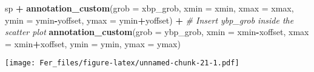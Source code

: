 \documentclass[
]{article}
\newenvironment{Shaded}{\begin{snugshade}}{\end{snugshade}}
\newcommand{\AttributeTok}[1]{\textcolor[rgb]{0.13,0.29,0.53}{#1}}
\newcommand{\CommentTok}[1]{\textcolor[rgb]{0.56,0.35,0.01}{\textit{#1}}}
\newcommand{\FunctionTok}[1]{\textcolor[rgb]{0.13,0.29,0.53}{\textbf{#1}}}
\newcommand{\NormalTok}[1]{#1}
\newcommand{\SpecialCharTok}[1]{\textcolor[rgb]{0.81,0.36,0.00}{\textbf{#1}}}
\begin{document}
\begin{Shaded}
\begin{Highlighting}[]
\NormalTok{sp }\SpecialCharTok{+} \FunctionTok{annotation\_custom}\NormalTok{(}\AttributeTok{grob =}\NormalTok{ xbp\_grob, }\AttributeTok{xmin =}\NormalTok{ xmin, }\AttributeTok{xmax =}\NormalTok{ xmax, }
                       \AttributeTok{ymin =}\NormalTok{ ymin}\SpecialCharTok{{-}}\NormalTok{yoffset, }\AttributeTok{ymax =}\NormalTok{ ymin}\SpecialCharTok{+}\NormalTok{yoffset) }\SpecialCharTok{+}
  \CommentTok{\# Insert ybp\_grob inside the scatter plot}
  \FunctionTok{annotation\_custom}\NormalTok{(}\AttributeTok{grob =}\NormalTok{ ybp\_grob,}
                    \AttributeTok{xmin =}\NormalTok{ xmin}\SpecialCharTok{{-}}\NormalTok{xoffset, }\AttributeTok{xmax =}\NormalTok{ xmin}\SpecialCharTok{+}\NormalTok{xoffset, }
                    \AttributeTok{ymin =}\NormalTok{ ymin, }\AttributeTok{ymax =}\NormalTok{ ymax)}
\end{Highlighting}
\end{Shaded}

\texttt{[image: Fer\_files/figure-latex/unnamed-chunk-21-1.pdf]}
\end{document}
